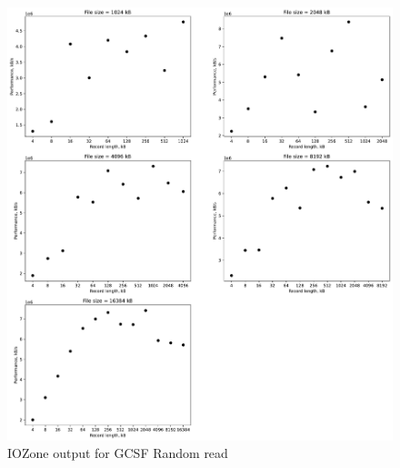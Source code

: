 \begin{figure}[!htb]
	\label{fig:app_benchgcsfs_rnd_read}
	\begin{center}
		\includegraphics[width=1.0\textwidth]{figures/benchmarking/gcsf/Random read.pdf}
	\end{center}
	\caption{IOZone output for GCSF Random read}
\end{figure}

